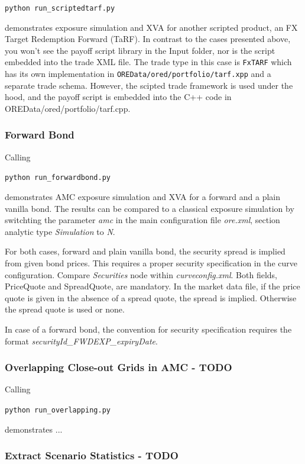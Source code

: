 \medskip
\centerline {\tt python run\_scriptedtarf.py} 

\medskip
demonstrates exposure simulation and XVA for another scripted product, an
FX Target Redemption Forward (TaRF). In contrast to the cases presented above, you won't see
the payoff script library in the Input folder, nor is the script embedded into the trade XML file.
The trade type in this case is {\tt FxTARF} which has its own implementation in {\tt OREData/ored/portfolio/tarf.xpp}
and a separate trade schema. However, the scipted trade framework is used under the hood, and the payoff
script is embedded into the C++ code in OREData/ored/portfolio/tarf.cpp.

\subsubsection{Forward Bond}

Calling 

\medskip
\centerline {\tt python run\_forwardbond.py} 

\medskip
demonstrates AMC exposure simulation and XVA for a forward and a plain vanilla bond.
The results can be compared to a classical exposure simulation by switchting the parameter \emph{amc} in the
main configuration file \emph{ore.xml}, section analytic type \emph{Simulation} to \emph{N}.

For both cases, forward and plain vanilla bond, the security spread is implied from given bond prices.
This requires a proper security specification in the curve configuration. Compare \emph{Securities} node
within \emph{curveconfig.xml}. Both fields, PriceQuote and SpreadQuote, are mandatory. In the market data file,
if the price quote is given in the absence of a spread quote, the spread is implied.
Otherwise the spread quote is used or none.

In case of a forward bond, the convention for security specification requires the format \emph{securityId\_FWDEXP\_expiryDate}.

\subsubsection{Overlapping Close-out Grids in AMC - TODO}

Calling 

\medskip
\centerline {\tt python run\_overlapping.py} 

\medskip
demonstrates ...

\subsubsection{Extract Scenario Statistics - TODO}


